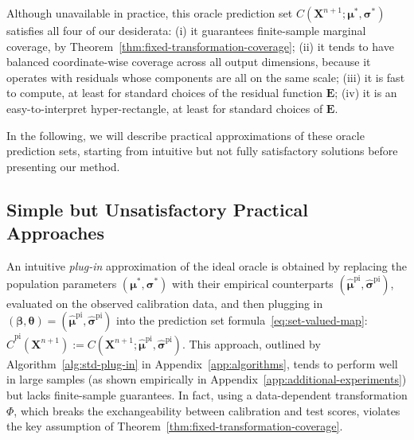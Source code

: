 Although unavailable in practice, this oracle prediction set $C(\mathbf{X}^{n+1}; \boldsymbol\mu^*, \boldsymbol\sigma^*)$ satisfies all four of our desiderata: (i) it guarantees finite-sample marginal coverage, by Theorem~\ref{thm:fixed-transformation-coverage}; (ii) it tends to have balanced coordinate-wise coverage across all output dimensions, because it operates with residuals whose components are all on the same scale; (iii) it is fast to compute, at least for standard choices of the residual function $\mathbf E$; (iv) it is an easy-to-interpret hyper-rectangle, at least for standard choices of $\mathbf E$.

In the following, we will describe practical approximations of these oracle prediction sets, starting from intuitive but not fully satisfactory solutions before presenting our method.


\subsection{Simple but Unsatisfactory Practical Approaches} \label{sec:data-splitting}

An intuitive {\em plug-in} approximation of the ideal oracle is obtained by replacing the population parameters $(\boldsymbol{\mu}^*,\boldsymbol{\sigma}^*)$ with their empirical counterparts $(\boldsymbol{\hat{\mu}}^{\mathrm{pi}},\boldsymbol{\hat{\sigma}}^{\mathrm{pi}})$, evaluated on the observed calibration data, and then plugging in $(\boldsymbol{\beta},\boldsymbol{\theta})=(\hat{\boldsymbol\mu}^{\mathrm{pi}}, \hat{\boldsymbol\sigma}^{\mathrm{pi}})$ into the prediction set formula~\eqref{eq:set-valued-map}: $\hat{C}^{\mathrm{pi}}(\mathbf{X}^{n+1}):= C(\mathbf{X}^{n+1};\hat{\boldsymbol\mu}^{\mathrm{pi}}, \hat{\boldsymbol\sigma}^{\mathrm{pi}})$. This approach, outlined by Algorithm~\ref{alg:std-plug-in} in Appendix~\ref{app:algorithms}, tends to perform well in large samples (as shown empirically in Appendix~\ref{app:additional-experiments}) but lacks finite-sample guarantees.
In fact, using a data-dependent transformation $\Phi$, which breaks the exchangeability between calibration and test scores, violates the key assumption of Theorem~\ref{thm:fixed-transformation-coverage}.

